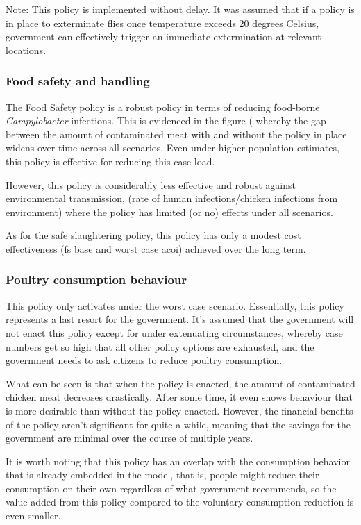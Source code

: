 Note: This policy is implemented without delay. It was assumed that if a policy is in place to exterminate flies once temperature exceeds 20 degrees Celsius, government can effectively trigger an immediate extermination at relevant locations.

\subsubsection{Food safety and handling}
\label{sec: food safety}
The Food Safety policy is a robust policy in terms of reducing food-borne \textit{Campylobacter} infections. This is evidenced in the figure (%
whereby the gap between the amount of contaminated meat with and without the policy in place widens over time across all scenarios. Even under higher population estimates, this policy is effective for reducing this case load.

However, this policy is considerably less effective and robust against environmental transmission, (rate of human infections/chicken infections from environment) where the policy has limited  (or no) effects under all scenarios.

As for the safe slaughtering policy, this policy has only a modest cost effectiveness (fs base and worst case acoi) achieved over the long term.


\subsubsection{Poultry consumption behaviour}
\label{sec: consumption behaviour}

This policy only activates under the worst case scenario. Essentially, this policy represents a last resort for the government. It's assumed that the government will not enact this policy except for under extenuating circumstances, whereby case numbers get so high that all other policy options are exhausted, and the government needs to ask citizens to reduce poultry consumption.

What can be seen is that when the policy is enacted, the amount of contaminated chicken meat decreases drastically. After some time, it even shows behaviour that is more desirable than without the policy enacted. However, the financial benefits of the policy aren't significant for quite a while, meaning that the savings for the government are minimal over the course of multiple years. 

It is worth noting that this policy has an overlap with the consumption behavior that is already embedded in the model, that is, people might reduce their consumption on their own regardless of what government recommends, so the value added from this policy compared to the voluntary consumption reduction is even smaller.

